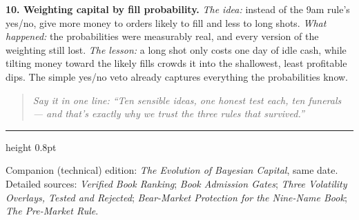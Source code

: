 \documentclass[11pt,a4paper]{article}
\newcommand{\oneline}[1]{\begin{quote}\itshape\color{bcteal}Say it in one line:
``#1''\end{quote}}
\begin{document}
\textbf{10. Weighting capital by fill probability.} \emph{The idea:} instead
of the 9am rule's yes/no, give more money to orders likely to fill and less
to long shots. \emph{What happened:} the probabilities were measurably real,
and every version of the weighting still lost. \emph{The lesson:} a long
shot only costs one day of idle cash, while tilting money toward the
likely fills crowds it into the shallowest, least profitable dips. The
simple yes/no veto already captures everything the probabilities know.

\oneline{Ten sensible ideas, one honest test each, ten funerals --- and
that's exactly why we trust the three rules that survived.}

\vspace{0.4cm}
{\color{bcnavy}\hrule height 0.8pt}
\vspace{0.2cm}
{\footnotesize\color{bcgrey} Companion (technical) edition: \emph{The
Evolution of Bayesian Capital}, same date. Detailed sources: \emph{Verified
Book Ranking}; \emph{Book Admission Gates}; \emph{Three Volatility Overlays,
Tested and Rejected}; \emph{Bear-Market Protection for the Nine-Name Book};
\emph{The Pre-Market Rule}.}
\end{document}
